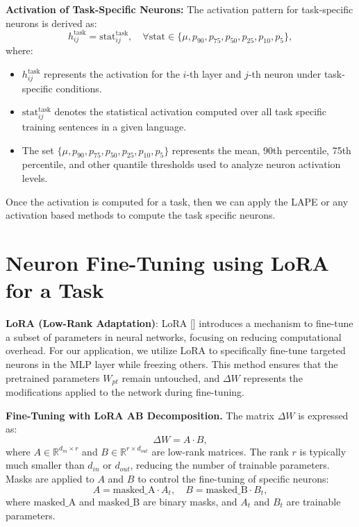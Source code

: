 \textbf{Activation of Task-Specific Neurons:} The activation pattern for task-specific neurons is derived as:
\begin{equation}
	h^{\text{task}}_{ij} = \text{stat}_{ij}^{\text{task}}, \quad \forall \text{stat} \in \{\mu, p_{90}, p_{75}, p_{50}, p_{25}, p_{10}, p_{5}\},
\end{equation}
where:
\begin{itemize}
	\item $h^{\text{task}}_{ij}$ represents the activation for the $i$-th layer and $j$-th neuron under task-specific conditions.
	\item $\text{stat}_{ij}^{\text{task}}$ denotes the statistical activation computed over all task specific training sentences in a given language.
	\item The set $\{\mu, p_{90}, p_{75}, p_{50}, p_{25}, p_{10}, p_{5}\}$ represents the mean, 90th percentile, 75th percentile, and other quantile thresholds used to analyze neuron activation levels.
\end{itemize}

Once the activation is computed for a task, then we can apply the LAPE or any activation based methods to compute the task specific neurons.

\section{Neuron Fine-Tuning using LoRA for a Task}

\textbf{LoRA (Low-Rank Adaptation)}: LoRA [\cite{lora}] introduces a mechanism to fine-tune a subset of parameters in neural networks, focusing on reducing computational overhead. For our application, we utilize LoRA to specifically fine-tune targeted neurons in the MLP layer while freezing others. This method ensures that the pretrained parameters \(W_{pt}\) remain untouched, and \(\Delta W\) represents the modifications applied to the network during fine-tuning.

\textbf{Fine-Tuning with LoRA AB Decomposition.} The matrix \(\Delta W\) is expressed as:
\begin{equation}
	\Delta W = A \cdot B,
\end{equation}
where \(A \in \mathbb{R}^{d_{in} \times r}\) and \(B \in \mathbb{R}^{r \times d_{out}}\) are low-rank matrices. The rank \(r\) is typically much smaller than \(d_{in}\) or \(d_{out}\), reducing the number of trainable parameters. Masks are applied to \(A\) and \(B\) to control the fine-tuning of specific neurons:
\begin{equation}
	A = \text{masked\_A} \cdot A_t, \quad B = \text{masked\_B} \cdot B_t,
\end{equation}
where \(\text{masked\_A}\) and \(\text{masked\_B}\) are binary masks, and \(A_t\) and \(B_t\) are trainable parameters.

